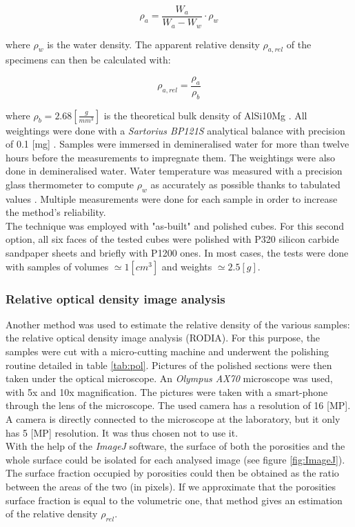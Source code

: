$$\rho_a=\frac{W_a}{W_a-W_w} \cdot \rho_w $$

where $\rho_w$ is the water density. The apparent relative density $\rho_{a,rel}$ of the specimens can then be calculated with:

$$\rho_{a,rel} = \frac{\rho_a}{\rho_b} $$

where $\rho_b = 2.68 [\frac{g}{mm^3}]$ is the theoretical bulk density of AlSi10Mg \parencite{Bulk}. All weightings were done with a \textit{Sartorius BP121S} analytical balance with precision of 0.1 [mg] \parencite{Balance}. Samples were immersed in demineralised water for more than twelve hours before the measurements to impregnate them. The weightings were also done in demineralised water. Water temperature was measured with a precision glass thermometer to compute $\rho_w$ as accurately as possible thanks to tabulated values \parencite{Eau}. Multiple measurements were done for each sample in order to increase the method's reliability. \\

The technique was employed with "as-built" and polished cubes. For this second option, all six faces of the tested cubes were polished with P320 silicon carbide sandpaper sheets and briefly with P1200 ones. In most cases, the tests were done with samples of volumes $\simeq 1 [cm^3]$ and weights $\simeq 2.5 [g]$.\\

\subsubsection{Relative optical density image analysis}

Another method was used to estimate the relative density of the various samples: the relative optical density image analysis (RODIA). For this purpose, the samples were cut with a micro-cutting machine and underwent the polishing routine detailed in table \ref{tab:pol}. Pictures of the polished sections were then taken under the optical microscope. An \textit{Olympus AX70} microscope was used, with 5x and 10x magnification. The pictures were taken with a smart-phone through the lens of the microscope. The used camera has a resolution of 16 [MP]. A camera is directly connected to the microscope at the laboratory, but it only has 5 [MP] resolution. It was thus chosen not to use it. \\

With the help of the \textit{ImageJ} software, the surface of both the porosities and the whole surface could be isolated for each analysed image (see figure \ref{fig:ImageJ}). The surface fraction occupied by porosities could then be obtained as the ratio between the areas of the two (in pixels). If we approximate that the porosities surface fraction is equal to the volumetric one, that method gives an estimation of the relative density $\rho_{rel}$.

